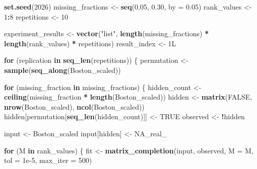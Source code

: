 \documentclass[
  11pt,
]{article}
\newenvironment{Shaded}{\begin{snugshade}}{\end{snugshade}}
\newcommand{\AttributeTok}[1]{\textcolor[rgb]{0.13,0.29,0.53}{#1}}
\newcommand{\ConstantTok}[1]{\textcolor[rgb]{0.56,0.35,0.01}{#1}}
\newcommand{\ControlFlowTok}[1]{\textcolor[rgb]{0.13,0.29,0.53}{\textbf{#1}}}
\newcommand{\DataTypeTok}[1]{\textcolor[rgb]{0.13,0.29,0.53}{#1}}
\newcommand{\DecValTok}[1]{\textcolor[rgb]{0.00,0.00,0.81}{#1}}
\newcommand{\FloatTok}[1]{\textcolor[rgb]{0.00,0.00,0.81}{#1}}
\newcommand{\FunctionTok}[1]{\textcolor[rgb]{0.13,0.29,0.53}{\textbf{#1}}}
\newcommand{\NormalTok}[1]{#1}
\newcommand{\OtherTok}[1]{\textcolor[rgb]{0.56,0.35,0.01}{#1}}
\newcommand{\SpecialCharTok}[1]{\textcolor[rgb]{0.81,0.36,0.00}{\textbf{#1}}}
\newcommand{\StringTok}[1]{\textcolor[rgb]{0.31,0.60,0.02}{#1}}
\begin{document}
\begin{Shaded}
\begin{Highlighting}[]
\FunctionTok{set.seed}\NormalTok{(}\DecValTok{2026}\NormalTok{)}
\NormalTok{missing\_fractions }\OtherTok{\textless{}{-}} \FunctionTok{seq}\NormalTok{(}\FloatTok{0.05}\NormalTok{, }\FloatTok{0.30}\NormalTok{, }\AttributeTok{by =} \FloatTok{0.05}\NormalTok{)}
\NormalTok{rank\_values }\OtherTok{\textless{}{-}} \DecValTok{1}\SpecialCharTok{:}\DecValTok{8}
\NormalTok{repetitions }\OtherTok{\textless{}{-}} \DecValTok{10}

\NormalTok{experiment\_results }\OtherTok{\textless{}{-}} \FunctionTok{vector}\NormalTok{(}\StringTok{"list"}\NormalTok{, }\FunctionTok{length}\NormalTok{(missing\_fractions) }\SpecialCharTok{*}
                               \FunctionTok{length}\NormalTok{(rank\_values) }\SpecialCharTok{*}\NormalTok{ repetitions)}
\NormalTok{result\_index }\OtherTok{\textless{}{-}} \DecValTok{1}\DataTypeTok{L}

\ControlFlowTok{for}\NormalTok{ (replication }\ControlFlowTok{in} \FunctionTok{seq\_len}\NormalTok{(repetitions)) \{}
\NormalTok{  permutation }\OtherTok{\textless{}{-}} \FunctionTok{sample}\NormalTok{(}\FunctionTok{seq\_along}\NormalTok{(Boston\_scaled))}

  \ControlFlowTok{for}\NormalTok{ (missing\_fraction }\ControlFlowTok{in}\NormalTok{ missing\_fractions) \{}
\NormalTok{    hidden\_count }\OtherTok{\textless{}{-}} \FunctionTok{ceiling}\NormalTok{(missing\_fraction }\SpecialCharTok{*} \FunctionTok{length}\NormalTok{(Boston\_scaled))}
\NormalTok{    hidden }\OtherTok{\textless{}{-}} \FunctionTok{matrix}\NormalTok{(}\ConstantTok{FALSE}\NormalTok{, }\FunctionTok{nrow}\NormalTok{(Boston\_scaled), }\FunctionTok{ncol}\NormalTok{(Boston\_scaled))}
\NormalTok{    hidden[permutation[}\FunctionTok{seq\_len}\NormalTok{(hidden\_count)]] }\OtherTok{\textless{}{-}} \ConstantTok{TRUE}
\NormalTok{    observed }\OtherTok{\textless{}{-}} \SpecialCharTok{!}\NormalTok{hidden}

\NormalTok{    input }\OtherTok{\textless{}{-}}\NormalTok{ Boston\_scaled}
\NormalTok{    input[hidden] }\OtherTok{\textless{}{-}} \ConstantTok{NA\_real\_}

    \ControlFlowTok{for}\NormalTok{ (M }\ControlFlowTok{in}\NormalTok{ rank\_values) \{}
\NormalTok{      fit }\OtherTok{\textless{}{-}} \FunctionTok{matrix\_completion}\NormalTok{(input, observed, }\AttributeTok{M =}\NormalTok{ M,}
                               \AttributeTok{tol =} \FloatTok{1e{-}5}\NormalTok{, }\AttributeTok{max\_iter =} \DecValTok{500}\NormalTok{)}


\end{Highlighting}
\end{Shaded}
\end{document}
